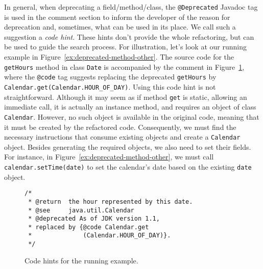 \documentclass[sigconf,review,anonymous]{acmart}
\begin{document}
In general, when deprecating a field/method/class, the \texttt{@Deprecated} Javadoc tag is used in the
comment section to inform the developer of the reason for deprecation and, sometimes, what can be used in its place. We call such a suggestion a {\em code hint}.
These hints don't provide the whole refactoring, but can be used to guide the search process.
%
For illustration, let's look at our running example in
Figure~\ref{ex:deprecated-method-other}.  The source code for the
\texttt{getHours} method in class \texttt{Date} is accompanied by the
comment in Figure~\ref{ex:code-hints}, where the \texttt{@code} tag suggests
replacing the deprecated \texttt{getHours} by
\texttt{Calendar.get(Calendar.HOUR\_OF\_DAY)}.
%
Using this code hint is not straightforward.
Although it may seem as if
method \texttt{get} is static, allowing an immediate call,
it is actually an instance method, and requires an object of
class \texttt{Calendar}. However, no such object is available in the
original code, meaning that it must be created by the refactored code.
Consequently, we must find the necessary
instructions that consume existing objects and create a \texttt{Calendar} object.
Besides generating the required objects, we also need to set their
fields. For instance,
in Figure~\ref{ex:deprecated-method-other}, we must call
\texttt{calendar.setTime(date)} to set the calendar's date
based on the existing \texttt{date} object.


\begin{figure}
\begin{lstlisting}[mathescape=true,showstringspaces=false]
/*
 * @return  the hour represented by this date.
 * @see     java.util.Calendar
 * @deprecated As of JDK version 1.1,
 * replaced by {@code Calendar.get
 *              (Calendar.HOUR_OF_DAY)}.
 */  
\end{lstlisting}
\caption{Code hints for the running example.}
\label{ex:code-hints}
\end{figure}




\end{document}
